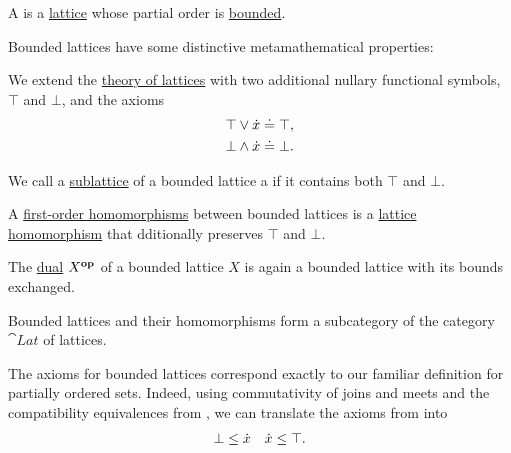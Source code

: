 \begin{definition}\label{def:bounded_lattice}
  A  is a \hyperref[def:lattice]{lattice} whose partial order is \hyperref[def:extremal_points/bounds]{bounded}.

  Bounded lattices have some distinctive metamathematical properties:
  \begin{thmenum}
    \mimprovised We extend the \hyperref[def:lattice/theory]{theory of lattices} with two additional nullary functional symbols, \( \top \) and \( \bot \), and the axioms
    \begin{align}
      \top \vee {\dot{x}} \doteq \top \label{eq:def:bounded_lattice/theory/top}, \\
      \bot \wedge {\dot{x}} \doteq \bot \label{eq:def:bounded_lattice/theory/bot}.
    \end{align}

    \mimprovised We call a \hyperref[def:lattice/submodel]{sublattice} of a bounded lattice a  if it contains both \( \top \) and \( \bot \).

     A \hyperref[def:first_order_homomorphism]{first-order homomorphisms} between bounded lattices is a \hyperref[def:lattice/homomorphism]{lattice homomorphism} that dditionally preserves \( \top \) and \( \bot \).

    \mimprovised The \hyperref[def:preordered_set/opposite]{dual} \( X^\oppos \) of a bounded lattice \( X \) is again a bounded lattice with its bounds exchanged.

    \mimprovised Bounded lattices and their homomorphisms form a subcategory of the category \( \cat{Lat} \) of lattices.
  \end{thmenum}
\end{definition}
\begin{comments}
  \item The axioms for bounded lattices correspond exactly to our familiar definition for partially ordered sets. Indeed, using commutativity of joins and meets and the compatibility equivalences from , we can translate the axioms from  into
  \begin{align*}
    \bot \leq {\dot{x}} && {\dot{x}} \leq \top.
  \end{align*}
\end{comments}

